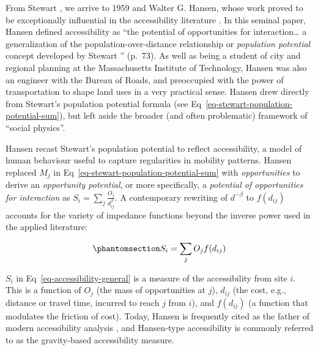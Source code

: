 \documentclass[
  10pt,
  letterpaper,
]{article}
\begin{document}
From Stewart \citep{stewartDemographicGravitationEvidence1948}, we
arrive to 1959 and Walter G. Hansen, whose work proved to be
exceptionally influential in the accessibility literature
\citep{hansen1959}. In this seminal paper, Hansen defined accessibility
as ``the potential of opportunities for interaction\ldots{} a
generalization of the population-over-distance relationship or
\emph{population potential} concept developed by Stewart
\citep{stewartDemographicGravitationEvidence1948}'' (p.~73). As well as
being a student of city and regional planning at the Massachusetts
Institute of Technology, Hansen was also an engineer with the Bureau of
Roads, and preoccupied with the power of transportation to shape land
uses in a very practical sense. Hansen \citep{hansen1959} drew directly
from Stewart's population potential formula (see
Eq~\ref{eq-stewart-population-potential-sum}), but left aside the
broader (and often problematic) framework of ``social physics''.

Hansen recast Stewart's population potential to reflect accessibility, a
model of human behaviour useful to capture regularities in mobility
patterns. Hansen replaced \(M_j\) in
Eq~\ref{eq-stewart-population-potential-sum} with \emph{opportunities}
to derive an \emph{opportunity potential}, or more specifically, a
\emph{potential of opportunities for interaction} as
\(S_{i} = \sum_j \frac{O_j }{d_{ij}^\beta}\). A contemporary rewriting
of \(d^{-\beta}\) to \(f(d_{ij})\) accounts for the variety of impedance
functions beyond the inverse power used in the applied literature:

\begin{equation}\phantomsection\label{eq-accessibility-general}{
S_{i} = \sum_j O_j  f(d_{ij})
}\end{equation}

\(S_{i}\) in Eq~\ref{eq-accessibility-general} is a measure of the
accessibility from site \(i\). This is a function of \(O_j\) (the mass
of opportunities at \(j\)), \(d_{ij}\) (the cost, e.g., distance or
travel time, incurred to reach \(j\) from \(i\)), and \(f(d_{ij})\) (a
function that modulates the friction of cost). Today, Hansen is
frequently cited as the father of modern accessibility analysis
\citep[e.g.,][]{reggianiGuestEditorialNew2011}, and Hansen-type
accessibility is commonly referred to as the gravity-based accessibility
measure.
\end{document}
